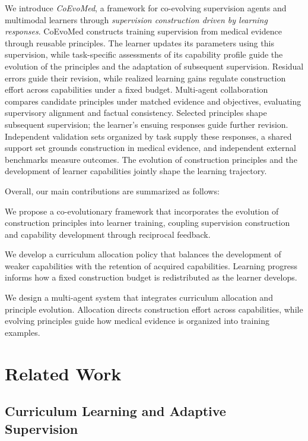 We introduce \emph{CoEvoMed}, a framework for co-evolving supervision agents and multimodal learners through \emph{supervision construction driven by learning responses}. CoEvoMed constructs training supervision from medical evidence through reusable principles. The learner updates its parameters using this supervision, while task-specific assessments of its capability profile guide the evolution of the principles and the adaptation of subsequent supervision. Residual errors guide their revision, while realized learning gains regulate construction effort across capabilities under a fixed budget. Multi-agent collaboration compares candidate principles under matched evidence and objectives, evaluating supervisory alignment and factual consistency. Selected principles shape subsequent supervision; the learner's ensuing responses guide further revision. Independent validation sets organized by task supply these responses, a shared support set grounds construction in medical evidence, and independent external benchmarks measure outcomes. The evolution of construction principles and the development of learner capabilities jointly shape the learning trajectory.

\begingroup
\frenchspacing
Overall, our main contributions are summarized as follows:

\noindent\textbullet\enspace We propose a co-evolutionary framework that incorporates the evolution of construction principles into learner training, coupling supervision construction and capability development through reciprocal feedback.

\noindent\textbullet\enspace We develop a curriculum allocation policy that balances the development of weaker capabilities with the retention of acquired capabilities. Learning progress informs how a fixed construction budget is redistributed as the learner develops.

\noindent\textbullet\enspace We design a multi-agent system that integrates curriculum allocation and principle evolution. Allocation directs construction effort across capabilities, while evolving principles guide how medical evidence is organized into training examples.
\par\endgroup


\section{Related Work}
\label{sec:related}

\subsection{Curriculum Learning and Adaptive Supervision}

